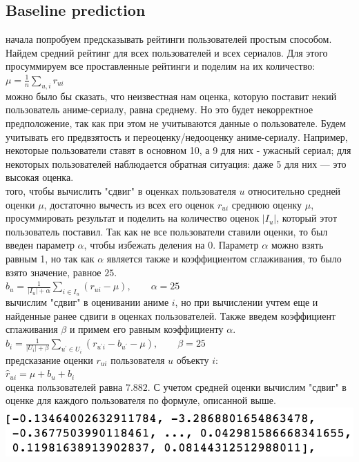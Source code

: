 \documentclass{article}
\newcommand\tab[1][1cm]{\hspace*{#1}}
\begin{document}
\subsection{Baseline prediction}
 начала попробуем предсказывать рейтинги пользователей простым способом. Найдем средний рейтинг для всех пользователей и всех сериалов. Для этого просуммируем все проставленные рейтинги и поделим на их количество:\\
\tab$\mu=\frac{1}{n}\sum_{u,i}r_{ui}$\\
 можно было бы сказать, что неизвестная нам оценка, которую поставит некий пользователь аниме-сериалу, равна среднему. Но это будет некорректное предположение, так как при этом не учитываются данные о пользователе.  Будем учитывать его предвзятость и переоценку/недооценку аниме-сериалу. Например, некоторые пользователи ставят в основном 10, а 9 для них - ужасный сериал; для некоторых пользователей наблюдается обратная ситуация: даже 5 для них — это высокая оценка.\\
 того, чтобы вычислить "сдвиг" в оценках пользователя $u$ относительно средней оценки $\mu$, достаточно вычесть из всех его оценок $r_{ui}$ среднюю оценку $\mu$, просуммировать результат и поделить на количество оценок $|I_u|$, который этот пользователь поставил. Так как не все пользователи ставили оценки, то был введен параметр $\alpha$, чтобы избежать деления на 0. Параметр $\alpha$ можно взять равным 1, но так как $\alpha$ является также и коэффициентом сглаживания, то было взято значение, равное $25$.\\
\tab$b_u=\frac{1}{|I_u|+\alpha}\sum_{i\in{}I_u}(r_{ui} - \mu), \qquad \alpha=25$\\
 вычислим "сдвиг" в оценивании аниме $i$, но при вычислении учтем еще и найденные ранее сдвиги в оценках пользователей. Также введем коэффициент сглаживания $\beta$ и примем его равным коэффициенту $\alpha$.\\
\tab$b_i=\frac{1}{|U_i|+\beta}\sum_{u^\prime\in{}U_i}(r_{u^\prime{}i} - b_{u^\prime} - \mu),  \qquad \beta=25$\\
 предсказание оценки $r_{ui}$ пользователя $u$ объекту $i$:\\
\tab$\hat{r}_{ui}=\mu+b_u+b_i$\\
 оценка пользователей равна $7.882$. С учетом средней оценки вычислим "сдвиг" в оценке для каждого пользователя по формуле, описанной выше.\\
\includegraphics[scale=0.8]{f12.png}\\
\end{document}
